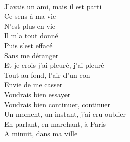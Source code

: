  \\
J'avais un ami, mais il est parti \\
Ce sens à ma vie \\
N'est plus en vie \\
Il m'a tout donné \\
Puis s'est effacé \\
Sans me déranger \\
Et je crois j'ai pleuré, j'ai pleuré \\
Tout au fond, l'air d'un con \\
Envie de me casser \\
Voudrais bien essayer \\
Voudrais bien continuer, continuer \\
Un moment, un instant, j'ai cru oublier \\
En parlant, en marchant, à Paris \\
A minuit, dans ma ville \\
